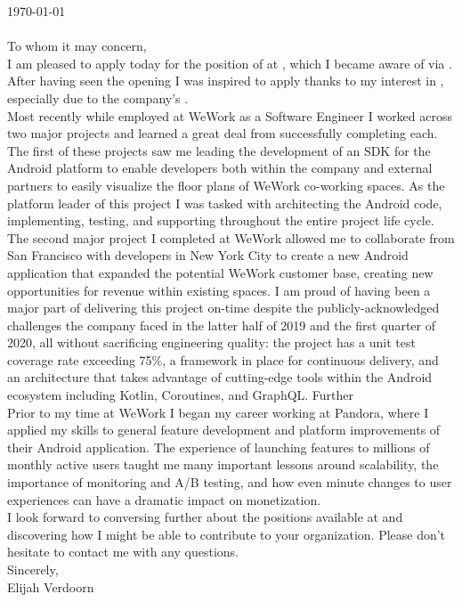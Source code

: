 \noindent\today
\\

\noindent\companyHeader
\\

\noindent To whom it may concern, \\

\noindent I am pleased to apply today for the position of \role at \company, which I became aware of via . After having seen the opening I was inspired to apply thanks to my interest in \interest, especially due to the company's \especially.\\

\noindent Most recently while employed at WeWork as a Software Engineer I worked across two major projects and learned a great deal from successfully completing each. The first of these projects saw me leading the development of an SDK for the Android platform to enable developers both within the company and external partners to easily visualize the floor plans of WeWork co-working spaces. As the platform leader of this project I was tasked with architecting the Android code, implementing, testing, and supporting throughout the entire project life cycle. The second major project I completed at WeWork allowed me to collaborate from San Francisco with developers in New York City to create a new Android application that expanded the potential WeWork customer base, creating new opportunities for revenue within existing spaces.  I am proud of having been a major part of delivering this project on-time despite the publicly-acknowledged challenges the company faced in the latter half of 2019 and the first quarter of 2020, all without sacrificing engineering quality: the project has a unit test coverage rate exceeding 75\%, a framework in place for continuous delivery, and an architecture that takes advantage of cutting-edge tools within the Android ecosystem including Kotlin, Coroutines, and GraphQL. Further\\

\noindent Prior to my time at WeWork I began my career working at Pandora, where I applied my skills to general feature development and platform improvements of their Android application. The experience of launching features to millions of monthly active users taught me many important lessons around scalability,  the importance of monitoring and A/B testing, and how even minute changes to user experiences can have a dramatic impact on monetization.\\

\noindent I look forward to conversing further about the positions available at \company and discovering how I might be able to contribute to your organization. Please don't hesitate to contact me with any questions.\\

\noindent Sincerely,
\\\noindent
Elijah Verdoorn

